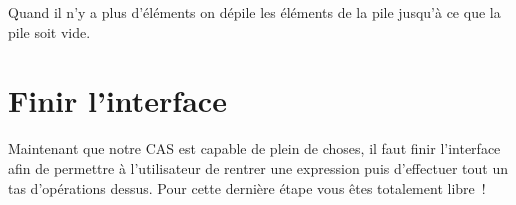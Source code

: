 \documentclass[12pt,a4paper]{report}
\newcommand{\cas}{\textsc{CAS}}
\begin{document}
Quand il n'y a plus d'éléments on dépile les éléments de la pile jusqu'à ce que la pile soit vide.


\section{Finir l'interface}

Maintenant que notre \cas{} est capable de plein de choses, il faut finir l'interface afin de permettre à l'utilisateur de rentrer une expression puis d'effectuer tout un tas d'opérations dessus. Pour cette dernière étape vous êtes totalement libre~!

\end{document}
